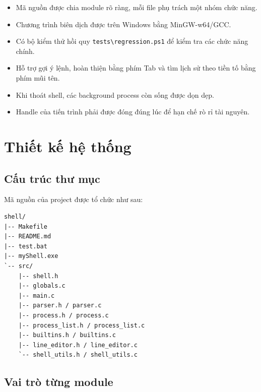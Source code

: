 \documentclass[13pt,a4paper,oneside]{extreport}
\begin{document}
\begin{itemize}[leftmargin=1.2cm]
	\item Mã nguồn được chia module rõ ràng, mỗi file phụ trách một nhóm chức năng.
	\item Chương trình biên dịch được trên Windows bằng MinGW-w64/GCC.
	\item Có bộ kiểm thử hồi quy \texttt{tests\textbackslash regression.ps1} để kiểm tra các chức năng chính.
	\item Hỗ trợ gợi ý lệnh, hoàn thiện bằng phím Tab và tìm lịch sử theo tiền tố bằng phím mũi tên.
	\item Khi thoát shell, các background process còn sống được dọn dẹp.
	\item Handle của tiến trình phải được đóng đúng lúc để hạn chế rò rỉ tài nguyên.
\end{itemize}

\chapter{Thiết kế hệ thống}

\section{Cấu trúc thư mục}

Mã nguồn của project được tổ chức như sau:

\begin{lstlisting}[language={},caption={Cấu trúc thư mục project}]
shell/
|-- Makefile
|-- README.md
|-- test.bat
|-- myShell.exe
`-- src/
    |-- shell.h
    |-- globals.c
    |-- main.c
    |-- parser.h / parser.c
    |-- process.h / process.c
    |-- process_list.h / process_list.c
    |-- builtins.h / builtins.c
    |-- line_editor.h / line_editor.c
    `-- shell_utils.h / shell_utils.c
\end{lstlisting}

\section{Vai trò từng module}
\end{document}
